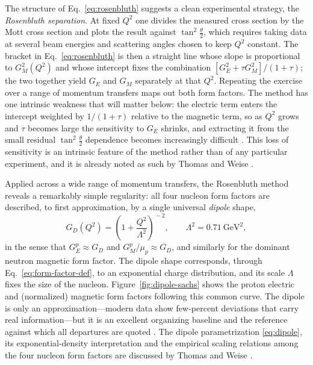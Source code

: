 The structure of Eq.~\eqref{eq:rosenbluth} suggests a clean experimental strategy,
the \emph{Rosenbluth separation}. At fixed $Q^{2}$ one divides the measured cross
section by the Mott cross section and plots the result against $\tan^{2}\tfrac{\theta}{2}$,
which requires taking data at several beam energies and scattering angles chosen to keep
$Q^{2}$ constant. The bracket in Eq.~\eqref{eq:rosenbluth} is then a straight line whose
slope is proportional to $G_{M}^{2}(Q^{2})$ and whose intercept fixes the combination
$[G_{E}^{2}+\tau G_{M}^{2}]/(1+\tau)$; the two together yield $G_{E}$ and $G_{M}$
separately at that $Q^{2}$. Repeating the exercise over a range of momentum transfers
maps out both form factors. The method has one intrinsic weakness that will matter
below: the electric term enters the intercept weighted by $1/(1+\tau)$ relative to the
magnetic term, so as $Q^{2}$ grows and $\tau$ becomes large the sensitivity to $G_{E}$
shrinks, and extracting it from the small residual $\tan^{2}\tfrac{\theta}{2}$ dependence
becomes increasingly difficult \cite[Ch.~14]{Amsler2018}. This loss of sensitivity is
an intrinsic feature of the method rather than of any particular experiment, and it is
already noted as such by Thomas and Weise \cite[Ch.~2.2]{ThomasWeise2001}.

Applied across a wide range of momentum transfers, the Rosenbluth method reveals a
remarkably simple regularity: all four nucleon form factors are described, to first
approximation, by a single universal \emph{dipole} shape,
\begin{equation}
    G_{D}(Q^{2}) = \left(1 + \frac{Q^{2}}{\Lambda^{2}}\right)^{\!-2},
    \qquad \Lambda^{2} = 0.71~\mathrm{GeV}^{2},
    \label{eq:dipole}
\end{equation}
in the sense that $G_{E}^{p}\approx G_{D}$ and $G_{M}^{p}/\mu_{p}\approx G_{D}$, and
similarly for the dominant neutron magnetic form factor. The dipole shape corresponds,
through Eq.~\eqref{eq:form-factor-def}, to an exponential charge distribution, and its
scale $\Lambda$ fixes the size of the nucleon. Figure~\ref{fig:dipole-sachs} shows the
proton electric and (normalized) magnetic form factors following this common curve.
The dipole is only an approximation---modern data show few-percent deviations that
carry real information---but it is an excellent organizing baseline and the reference
against which all departures are quoted \cite[Ch.~14]{Amsler2018}. The dipole
parametrization \eqref{eq:dipole}, its exponential-density interpretation and the
empirical scaling relations among the four nucleon form factors are discussed by Thomas
and Weise \cite[Ch.~2.2]{ThomasWeise2001}.

